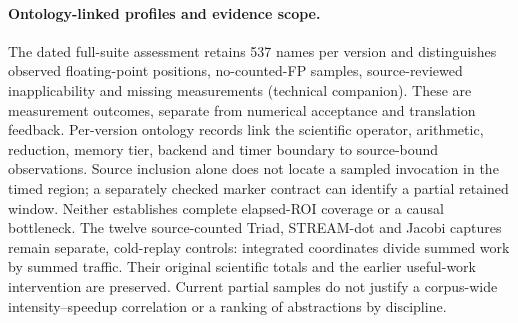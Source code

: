 \paragraph{Ontology-linked profiles and evidence scope.}
The dated full-suite assessment retains 537 names per version and distinguishes
observed floating-point positions, no-counted-FP samples, source-reviewed
inapplicability and missing measurements (technical companion). These are
measurement outcomes, separate from numerical acceptance and translation
feedback. Per-version ontology records link the scientific operator, arithmetic,
reduction, memory tier, backend and timer boundary to source-bound observations.
Source inclusion alone does not locate a sampled invocation in the timed region;
a separately checked marker contract can identify a partial retained window.
Neither establishes complete elapsed-ROI coverage or a causal bottleneck.
The twelve source-counted Triad, STREAM-dot and Jacobi captures remain separate,
cold-replay controls: integrated coordinates divide summed work by summed traffic.
Their original scientific totals and the earlier useful-work intervention are
preserved. Current partial samples do not justify a corpus-wide
intensity--speedup correlation or a ranking of abstractions by discipline.
